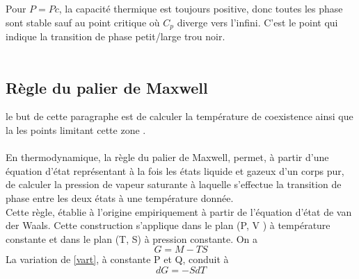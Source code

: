 \documentclass[12pt,  a4paper, openright]{report} %
\begin{document}
%
%
%
%


Pour $P = Pc$, la capacité thermique est toujours positive, donc toutes
les phase sont stable sauf au point critique où $C_{p}$ diverge vers l’infini. C’est le point qui
indique la transition de phase petit/large trou noir.\\ 
\\
%

\subsection{ Règle du palier de Maxwell}
le but de cette paragraphe est de calculer la température de coexistence
ainsi que la les points limitant cette zone .\\
\\
En thermodynamique, la règle du palier de Maxwell, permet, à partir d'une équation d'état représentant à la fois les états liquide et gazeux d'un corps pur, de calculer la pression de vapeur saturante à laquelle s'effectue la transition de phase entre les deux états à une température donnée.\\

Cette règle, établie à l'origine empiriquement à partir de l'équation d'état de van der Waals. Cette construction s’applique dans le
plan (P, V ) à température constante et dans le plan (T, S) à pression constante. On a 
\begin{equation}
\label{vart}
G=M-TS
\end{equation}
La variation de \ref{vart}, à constante P et Q, conduit à
\begin{equation}
\label{varr}
 dG=-SdT
\end{equation}
\end{document}
